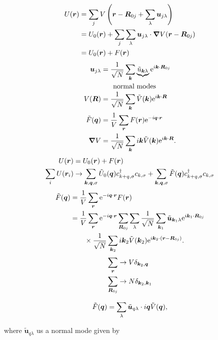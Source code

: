 \begin{align}
	U(\bm{r}) &= \sum_{j}V\left (\bm{r} - \bm{R}_{0j} + \sum_{\lambda}\bm{u}_{j\lambda}\right ) \nonumber \\
	&= U_{0}(\bm{r}) + \sum_{j}\sum_{\lambda}\bm{u}_{j\lambda}\cdot \grad{V}(\bm{r}-\bm{R}_{0j}) \nonumber \\
	&= U_{0}(\bm{r}) + F(\bm{r})
\end{align}
\begin{align}
	\bm{u}_{j\lambda} &= \frac{1}{\sqrt{N}}\sum_{\bm{k}}\underbrace{\tilde{u}_{\bm{k}\lambda}}_{\mathclap{\parbox{3cm}{\vspace{0.8em}normal modes}}}\e^{i\bm{k}\cdot\vR_{0j}} \\
V(\vR) &= \frac{1}{\sqrt{N}}\sum_{\bm{k}}\tilde{V}(\bm{k})\e^{i\bm{k}\cdot \vR} \\
\tilde{F}(\vq) &= \frac{1}{V}\sum_{\vr}F(\vr)\e^{-i\vq\cdot\vr} \\
\grad{V} &= \frac{1}{\sqrt{N}}\sum_{\bm{k}}i\bm{k}\tilde{V}(\bm{k})\e^{i\bm{k}\cdot\vR}.
\end{align}
\begin{align}
	U(\bm{r}) &= U_{0}(\bm{r}) + F(\bm{r}) \\ 
	\sum_{i}U(\bm{r}_{i})&\rightarrow \sum_{\bm{k},\bm{q},\sigma}\tilde{U}_{0}(\bm{q})c^{\dagger}_{k+q,\sigma}c_{k,\sigma} + \sum_{\bm{k},\bm{q},\sigma}\tilde{F}(\bm{q})c^{\dagger}_{k+q,\sigma}c_{k,\sigma}
\end{align}
\begin{align}
\tilde{F}(\bm{q}) &= \frac{1}{V}\sum_{\bm{r}}\mathrm{e}^{-i\bm{q}\cdot\bm{r}}F(\bm{r}) \\
&= \frac{1}{V}\sum_{\bm{r}}\mathrm{e}^{-i\bm{q}\cdot\bm{r}} \sum_{\bm{R}_{0j}}\sum_{\lambda}\frac{1}{\sqrt{N}}\sum_{\bm{k}_1}\tilde{\bm{u}}_{\bm{k}_1\lambda}\mathrm{e}^{i\bm{k}_1\cdot\bm{R}_{0j}} \\
&\qquad\times \frac{1}{\sqrt{N}}\sum_{\bm{k}_2}i\bm{k}_2\tilde{V}(\bm{k}_2)\mathrm{e}^{i\bm{k}_2\cdot(\bm{r}-\bm{R}_{0j})}.
\end{align}
\begin{align}
	\sum_{\bm{r}} &\rightarrow V\delta_{\bm{k}_2,\bm{q}} \\
	\sum_{\bm{R}_{0j}} &\rightarrow N\delta_{\bm{k}_2,\bm{k}_1}
\end{align}
\begin{tcolorbox}
	\begin{equation}
		\tilde{F}(\bm{q}) = \sum_{\lambda} \tilde{\bm{u}}_{q\lambda}\cdot i\bm{q} \tilde{V}(\bm{q}),
	\end{equation}
\end{tcolorbox}
where $\tilde{\bm{u}}_{q\lambda}$ us a normal mode given by 
